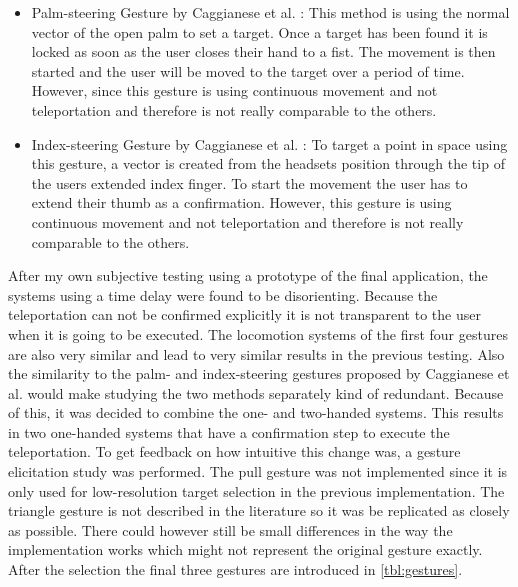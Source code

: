 \begin{itemize}
    \item Palm-steering Gesture by Caggianese et al. \cite{Caggianese}:
    This method is using the normal vector of the open palm to set a target. Once a target has been found it is locked as soon as the user closes their hand to a fist. The movement is then started and the user will be moved to the target over a period of time.
    However, since this gesture is using continuous movement and not teleportation and therefore is not really comparable to the others.
    
    \item Index-steering Gesture by Caggianese et al. \cite{Caggianese}:
    To target a point in space using this gesture, a vector is created from the headsets position through the tip of the users extended index finger. To start the movement the user has to extend their thumb as a confirmation.
    However, this gesture is using continuous movement and not teleportation and therefore is not really comparable to the others.
\end{itemize}

After my own subjective testing using a prototype of the final application, the systems using a time delay were found to be disorienting. Because the teleportation can not be confirmed explicitly it is not transparent to the user when it is going to be executed. The locomotion systems of the first four gestures are also very similar and lead to very similar results in the previous testing. Also the similarity to the palm- and index-steering gestures proposed by Caggianese et al. would make studying the two methods separately kind of redundant. Because of this, it was decided to combine the one- and two-handed systems. This results in two one-handed systems that have a confirmation step to execute the teleportation. To get feedback on how intuitive this change was, a gesture elicitation study was performed. The pull gesture was not implemented since it is only used for low-resolution target selection in the previous implementation. The triangle gesture is not described in the literature so it was be replicated as closely as possible. There could however still be small differences in the way the implementation works which might not represent the original gesture exactly. After the selection the final three gestures are introduced in \ref{tbl:gestures}.


